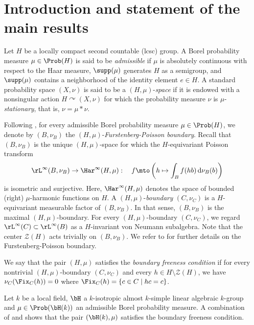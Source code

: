 \section{Introduction and statement of the main results}

Let $H$ be a locally compact second countable (lcsc) group. A Borel probability measure $\mu \in \Prob(H)$ is said to be \emph{admissible} if $\mu$ is absolutely continuous with respect to the Haar measure, $\supp(\mu)$ generates $H$ as a semigroup, and $\supp(\mu)$ contains a neighborhood of the identity element $e \in H$. A standard probability space $(X, \nu)$ is said to be a $(H, \mu)$-\emph{space} if it is endowed with a nonsingular action $H \curvearrowright (X, \nu)$ for which the probability measure $\nu$ is $\mu$-\emph{stationary}, that is, $\nu = \mu \ast \nu$.

Following \cite{Fu62a, Fu62b}, for every admissible Borel probability measure $\mu \in \Prob(H)$, we denote by $(B, \nu_B)$ the $(H, \mu)$-\emph{Furstenberg-Poisson boundary}. Recall that $(B, \nu_B)$ is the unique $(H, \mu)$-space for which the $H$-equivariant Poisson transform
\[
\rL^\infty(B, \nu_B) \to \Har^\infty(H, \mu) :\quad f \mto \left( h \mapsto \int_B f(h b) \, {\rm d}\nu_B(b) \right)
\]
is isometric and surjective. Here, $\Har^\infty(H, \mu)$ denotes the space of bounded (right) $\mu$-harmonic functions on $H$. A $(H, \mu)$-\emph{boundary} $(C, \nu_C)$ is a $H$-equivariant measurable factor of $(B, \nu_B)$. In that sense, $(B, \nu_B)$ is the maximal $(H, \mu)$-boundary. For every $(H, \mu)$-boundary $(C, \nu_C)$, we regard $\rL^\infty(C) \subset \rL^\infty(B)$ as a $H$-invariant von Neumann subalgebra. Note that the center $\mathscr Z(H)$ acts trivially on $(B, \nu_B)$. We refer to \cite{Fu00, BS04} for further details on the Furstenberg-Poisson boundary.

\begin{definition}
We say that the pair $(H, \mu)$ satisfies the \emph{boundary freeness condition} if for every nontrivial $(H, \mu)$-boundary $(C, \nu_C)$ and every $h \in H \setminus \mathscr Z(H)$, we have $\nu_C(\Fix_C(h)) = 0$ where $\Fix_C(h) = \left\{c \in C \mid hc = c \right\}$.
\end{definition}

\begin{example}
Let $k$ be a local field, $\bH$ a $k$-isotropic almost $k$-simple linear algebraic $k$-group and $\mu \in \Prob(\bH(k))$ an admissible Borel probability measure. A combination of \cite[Cor.\,5.2]{BS04} and \cite[Lem.\,6.2]{BBHP20} shows that the pair $(\bH(k), \mu)$ satisfies the boundary freeness condition.
\end{example}


